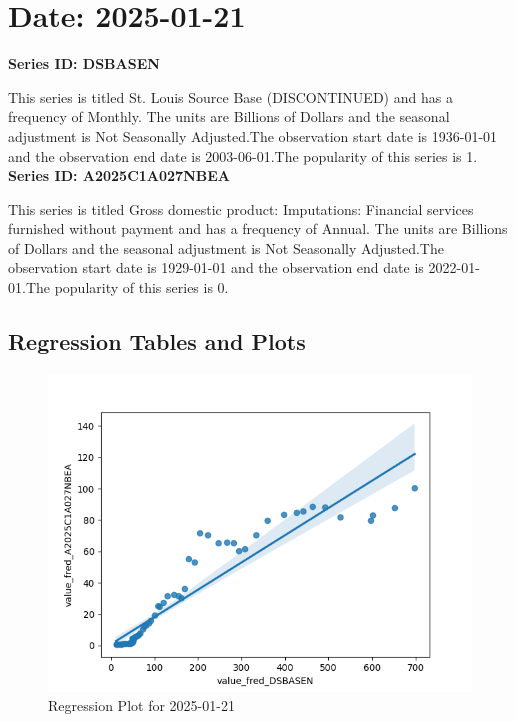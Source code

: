 \section{Date: 2025-01-21}
\noindent \textbf{Series ID: DSBASEN} 

\noindent This series is titled St. Louis Source Base (DISCONTINUED) and has a frequency of Monthly. The units are Billions of Dollars and the seasonal adjustment is Not Seasonally Adjusted.The observation start date is 1936-01-01 and the observation end date is 2003-06-01.The popularity of this series is 1. \\ 

\noindent \textbf{Series ID: A2025C1A027NBEA} 

\noindent This series is titled Gross domestic product: Imputations: Financial services furnished without payment and has a frequency of Annual. The units are Billions of Dollars and the seasonal adjustment is Not Seasonally Adjusted.The observation start date is 1929-01-01 and the observation end date is 2022-01-01.The popularity of this series is 0. \\ 

\subsection{Regression Tables and Plots}


\begin{figure}
\centering
\includegraphics[scale = 0.9]{plots/plot_2025-01-21.png}
\caption{Regression Plot for 2025-01-21}
\end{figure}
\newpage
